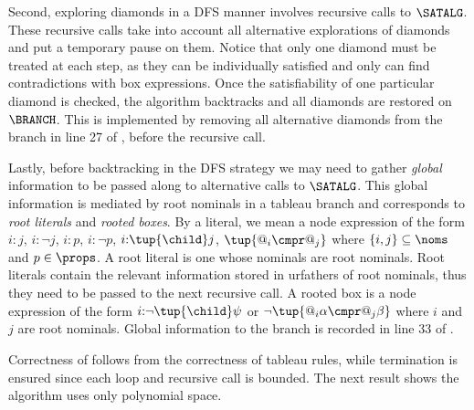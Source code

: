 \begin{description}
        Second, exploring diamonds in a DFS manner involves recursive calls to $\SATALG$.
        These recursive calls take into account all alternative explorations of diamonds and put a temporary pause on them. Notice that only one diamond must be treated at each step, as they can be individually satisfied and only can find contradictions with box expressions. Once the satisfiability of one particular diamond is checked, the algorithm backtracks and all diamonds are restored on $\BRANCH$. 
        This is implemented by removing all alternative diamonds from the branch in line 27 of , before the recursive call.

        Lastly, before backtracking in the DFS strategy we may need to gather \emph{global} information to be passed along to alternative calls to $\SATALG$.
        This global information %
        is mediated by root nominals in a tableau branch and corresponds to \emph{root literals} and \emph{rooted boxes}.
        By a literal, we mean a node expression of the form $i{:}j$, $i{:}\lnot j$, $i{:}p$, $i{:}\lnot p$, $i{:}\tup{\child}j$, $\tup{@_i \cmpr @_j}$ where $\{i,j\} \subseteq \noms$ and $p \in \props$.
        A root literal is one whose nominals are root nominals.
        Root literals contain the relevant information stored in urfathers of root nominals, thus they need to be passed to the next recursive call.
        A rooted box is a node expression of the form $i{:}\lnot\tup{\child}\psi$ or $\lnot\tup{@_i\alpha \cmpr @_j\beta}$ where $i$ and $j$ are root nominals.
        Global information to the branch is recorded in line 33 of .
\end{description}


Correctness of  follows from the correctness of tableau rules, while termination is ensured since each loop and recursive call is bounded. The next result shows the algorithm uses only polynomial space.

